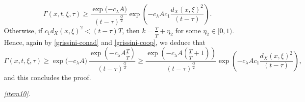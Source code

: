 \documentclass[11pt,a4paper]{article}
\numberwithin{equation}{section}
\def \G {{\Gamma}}
\def \l {{\lambda}}
\def \t {{\tau}}
\def \x {{\xi}}
\def \y {{\eta}}
\begin{document}
\begin{pf-fundamental}
	\begin{equation}
		\G(x,t,\x,\t)\geq \frac{\exp\big({-c_\l A\big)}}{(t-\t)^\frac{Q}{2}}\exp{\left(-c_\l Ac_1\frac{d_X(x,\x)^2}{(t-\t)}\right)}.
	\end{equation}
	Otherwise, if $c_1d_X(x,\x)^2< (t-\t)T$, then $k =\frac{T}{\tilde T}+\y_2$ for some $\y_2\in [0,1)$. Hence, again by \eqref{grissini-conad} and \eqref{grissini-coop}, we deduce that
	\begin{equation}
		\G(x,t,\x,\t)\geq \exp\big({-c_\l A}\big)\,\frac{\exp{\left(-c_\l A\frac{T}{\tilde T}\right)}}{(t-\t)^\frac{Q}{2}}\geq \frac{\exp{\left(-c_\l A \left(\frac{T}{\tilde T}+1\right)\right)}}{(t-\t)^\frac{Q}{2}}\exp{\left(-c_\l Ac_1\frac{d_X(x,\x)^2}{(t-\t)}\right)},
	\end{equation}
	and this concludes the proof.
	

	\medskip\emph{\ref{item10}.}
	

\end{pf-fundamental}
\end{document}
